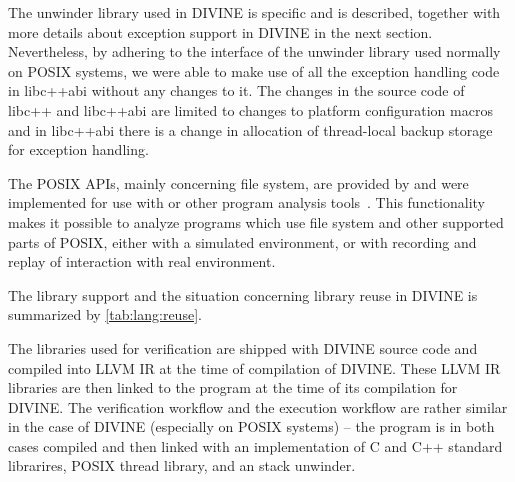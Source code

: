 The unwinder library used in DIVINE is \divm specific and is described,
together with more details about exception support in DIVINE in the next
section.
Nevertheless, by adhering to the interface of the unwinder library used normally
on POSIX systems, we were able to make use of all the exception handling code
in libc++abi without any changes to it.
The changes in the source code of libc++ and libc++abi are limited to changes to platform configuration macros and in libc++abi there is a change in allocation of thread-local backup storage for exception handling.

The POSIX APIs, mainly concerning file system, are provided by \dios and were
implemented for use with \divine or other program analysis tools~.
This functionality makes it possible to analyze programs which use file system and other supported parts of POSIX, either with a simulated environment, or with recording and replay of interaction with real environment.

The library support and the situation concerning library reuse in DIVINE is summarized by \autoref{tab:lang:reuse}.

The libraries used for verification are shipped with DIVINE source code and
compiled into LLVM IR at the time of compilation of DIVINE.
These LLVM IR libraries are then linked to the program at the time of its
compilation for DIVINE.
The verification workflow and the execution workflow are rather similar in the
case of DIVINE (especially on POSIX systems) -- the program is in both cases
compiled and then linked with an implementation of C and C++ standard
librarires, POSIX thread library, and an stack unwinder.

